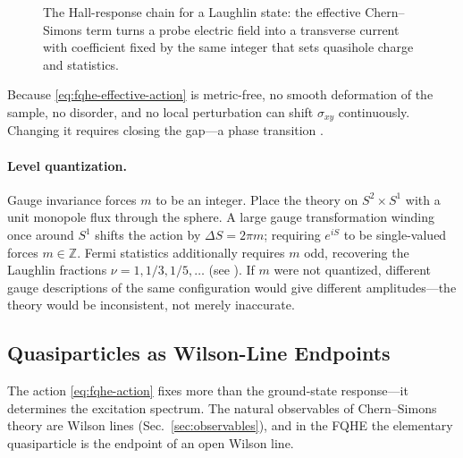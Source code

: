 \begin{figure}[h]
    \centering
    
    \caption{The Hall-response chain for a Laughlin state: the effective Chern--Simons term turns a probe electric field into a transverse current with coefficient fixed by the same integer that sets quasihole charge and statistics.}
    \label{fig:fqhe-hall-response}
\end{figure}

Because \eqref{eq:fqhe-effective-action} is metric-free, no smooth deformation of the sample, no disorder, and no local perturbation can shift $\sigma_{xy}$ continuously. Changing it requires closing the gap---a phase transition \cite{Wen1990TopologicalOrders,Wen1995TopologicalOrdersEdgeExcitations}.

\paragraph{Level quantization.}
Gauge invariance forces $m$ to be an integer. Place the theory on $S^{2}\times S^{1}$ with a unit monopole flux through the sphere. A large gauge transformation winding once around $S^{1}$ shifts the action by $\Delta S = 2\pi m$; requiring $e^{iS}$ to be single-valued forces $m\in\mathbb{Z}$. Fermi statistics additionally requires $m$ odd, recovering the Laughlin fractions $\nu=1,1/3,1/5,\ldots$ (see \cite{Dunne1999AspectsCS,TongQuantumHallLectures}). If $m$ were not quantized, different gauge descriptions of the same configuration would give different amplitudes---the theory would be inconsistent, not merely inaccurate.

\subsection{Quasiparticles as Wilson-Line Endpoints}
\label{subsec:quasiparticles}

The action \eqref{eq:fqhe-action} fixes more than the ground-state response---it determines the excitation spectrum. The natural observables of Chern--Simons theory are Wilson lines (Sec.~\ref{sec:observables}), and in the FQHE the elementary quasiparticle is the endpoint of an open Wilson line.

